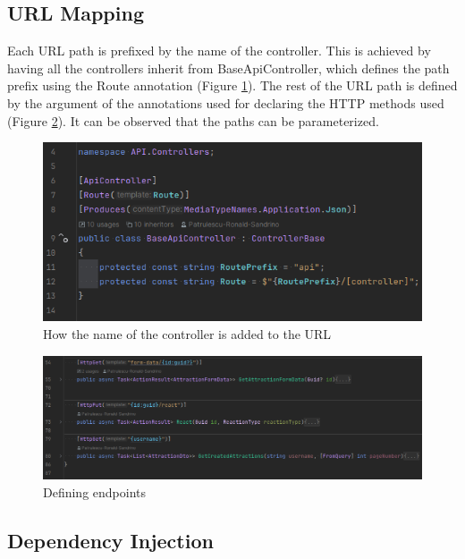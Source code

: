 \subsection{URL Mapping}

\par Each URL path is prefixed by the name of the controller. This is achieved by having all the controllers inherit from BaseApiController, which defines the path prefix using the Route annotation (Figure \ref{fig:url-mapping-baseapicontroller}). The rest of the URL path is defined by the argument of the annotations used for declaring the HTTP methods used (Figure \ref{fig:url-mapping-endpoints}). It can be observed that the paths can be parameterized.

\begin{figure}[!ht]
    \centering
    \includegraphics[width=1\linewidth]{4.3.4_url-mapping-baseapicontroller.png}
    \caption{How the name of the controller is added to the URL}
    \label{fig:url-mapping-baseapicontroller}
\end{figure}

\begin{figure}[!ht]
    \centering
    \includegraphics[width=1\linewidth]{4.3.4_url-mapping-endpoints.png}
    \caption{Defining endpoints}
    \label{fig:url-mapping-endpoints}
\end{figure}

\subsection{Dependency Injection}

